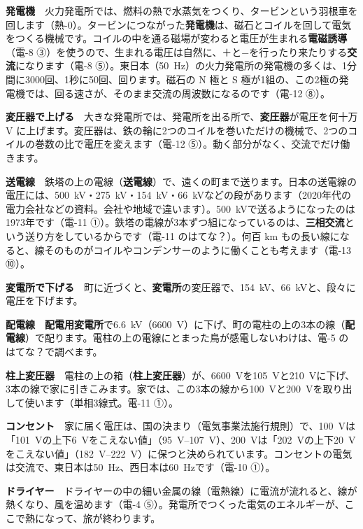 \begin{enumerate}[label={\bkcircled[bkBlue]{\arabic*}}, leftmargin=2.4\zw, itemsep=2pt, topsep=2pt]
\item \textbf{発電機}　火力発電所では、燃料の熱で水蒸気をつくり、タービンという羽根車を回します（熱-0）。タービンにつながった\textbf{発電機}は、磁石とコイルを回して電気をつくる機械です。コイルの中を通る磁場が変わると電圧が生まれる\textbf{電磁誘導}（電-8 ③）を使うので、生まれる電圧は自然に、＋と−を行ったり来たりする\textbf{交流}になります（電-8 ⑤）。東日本（\qty{50}{Hz}）の火力発電所の発電機の多くは、1分間に3000回、1秒に50回、回ります。磁石の N 極と S 極が1組の、この2極の発電機では、回る速さが、そのまま交流の周波数になるのです（電-12 ⑧）。
\item \textbf{変圧器で上げる}　大きな発電所では、発電所を出る所で、\textbf{変圧器}が電圧を何十万 V に上げます。変圧器は、鉄の輪に2つのコイルを巻いただけの機械で、2つのコイルの巻数の比で電圧を変えます（電-12 ⑤）。動く部分がなく、交流でだけ働きます。
\item \textbf{送電線}　鉄塔の上の電線（\textbf{送電線}）で、遠くの町まで送ります。日本の送電線の電圧には、\qty{500}{kV}・\qty{275}{kV}・\qty{154}{kV}・\qty{66}{kV}などの段があります（2020年代の電力会社などの資料。会社や地域で違います）。\qty{500}{kV}で送るようになったのは1973年です（電-11 ①）。鉄塔の電線が3本ずつ組になっているのは、\textbf{三相交流}という送り方をしているからです（電-11 のはてな？）。何百 km もの長い線になると、線そのものがコイルやコンデンサーのように働くことも考えます（電-13 ⑩）。
\item \textbf{変電所で下げる}　町に近づくと、\textbf{変電所}の変圧器で、\qty{154}{kV}、\qty{66}{kV}と、段々に電圧を下げます。
\item \textbf{配電線}　\textbf{配電用変電所}で\qty{6.6}{kV}（\qty{6600}{V}）に下げ、町の電柱の上の3本の線（\textbf{配電線}）で配ります。電柱の上の電線にとまった鳥が感電しないわけは、電-5 のはてな？で調べます。
\item \textbf{柱上変圧器}　電柱の上の箱（\textbf{柱上変圧器}）が、\qty{6600}{V}を\qty{105}{V}と\qty{210}{V}に下げ、3本の線で家に引きこみます。家では、この3本の線から\qty{100}{V}と\qty{200}{V}を取り出して使います（単相3線式。電-11 ①）。
\item \textbf{コンセント}　家に届く電圧は、国の決まり（電気事業法施行規則）で、\qty{100}{V}は「\qty{101}{V}の上下\qty{6}{V}をこえない値」（\qtyrange{95}{107}{V}）、\qty{200}{V}は「\qty{202}{V}の上下\qty{20}{V}をこえない値」（\qtyrange{182}{222}{V}）に保つと決められています。コンセントの電気は交流で、東日本は\qty{50}{Hz}、西日本は\qty{60}{Hz}です（電-10 ①）。
\item \textbf{ドライヤー}　ドライヤーの中の細い金属の線（電熱線）に電流が流れると、線が熱くなり、風を温めます（電-4 ⑤）。発電所でつくった電気のエネルギーが、ここで熱になって、旅が終わります。
\end{enumerate}
